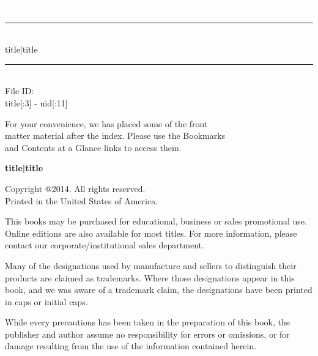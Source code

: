 \documentclass{article}
\newcommand{\HRule}{\rule{\linewidth}{2mm}}
\begin{document}
\begin{titlepage}

\begin{flushright}
\textcolor{white}{hidden text}

\vspace{7cm}

\HRule \\[0.4cm]
{\large {{ title|title }} }\\[0.4cm]
\HRule \\[1.5cm]

\large{File ID:}\\
\small{ {{ title[:3] }}-{{ uid[:11] }} }

\end{flushright}

\vfill

\begin{flushright}
\footnotesize{ For your convenience, we has placed some of the front \\
matter material after the index. Please use the Bookmarks \\
and Contents at a Glance links to access them. }
\end{flushright}

\end{titlepage}
\noindent
{\textbf {\footnotesize {{ title|title }} }}

\vspace{6pt}

\noindent
\scriptsize{Copyright @2014. All rights reserved. \\Printed in the United
  States of America.}

\noindent
\scriptsize{This books may be purchased for educational, business or
  sales promotional use. Online editions are also available for most
  titles. For more information, please contact our
  corporate/institutional sales department.}

\vfill

\noindent
\scriptsize{Many of the designations used by manufacture and sellers
  to distinguish their products are claimed as trademarks. Where those
  designations appear in this book, and we was aware of a trademark
  claim, the designations have been printed in caps or initial caps.}

\noindent
\scriptsize{While every precautions has been taken in the preparation of
  this book, the publisher and author assume no responsibility for
  errors or omissions, or for damage resulting from the use of the
  information contained herein.}
\end{document}
